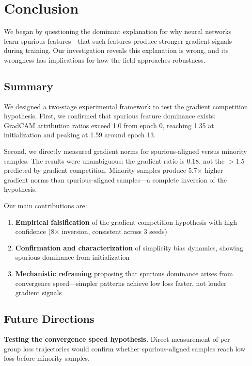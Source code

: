\section{Conclusion}

We began by questioning the dominant explanation for why neural networks learn spurious features---that such features produce stronger gradient signals during training. Our investigation reveals this explanation is wrong, and its wrongness has implications for how the field approaches robustness.

\subsection{Summary}

We designed a two-stage experimental framework to test the gradient competition hypothesis. First, we confirmed that spurious feature dominance exists: GradCAM attribution ratios exceed 1.0 from epoch 0, reaching 1.35 at initialization and peaking at 1.59 around epoch 13.

Second, we directly measured gradient norms for spurious-aligned versus minority samples. The results were unambiguous: the gradient ratio is 0.18, not the $>$1.5 predicted by gradient competition. Minority samples produce 5.7$\times$ higher gradient norms than spurious-aligned samples---a complete inversion of the hypothesis.

Our main contributions are:

\begin{enumerate}
    \item \textbf{Empirical falsification} of the gradient competition hypothesis with high confidence (8$\times$ inversion, consistent across 3 seeds)

    \item \textbf{Confirmation and characterization} of simplicity bias dynamics, showing spurious dominance from initialization

    \item \textbf{Mechanistic reframing} proposing that spurious dominance arises from convergence speed---simpler patterns achieve low loss faster, not louder gradient signals
\end{enumerate}

\subsection{Future Directions}

\textbf{Testing the convergence speed hypothesis.} Direct measurement of per-group loss trajectories would confirm whether spurious-aligned samples reach low loss before minority samples.

